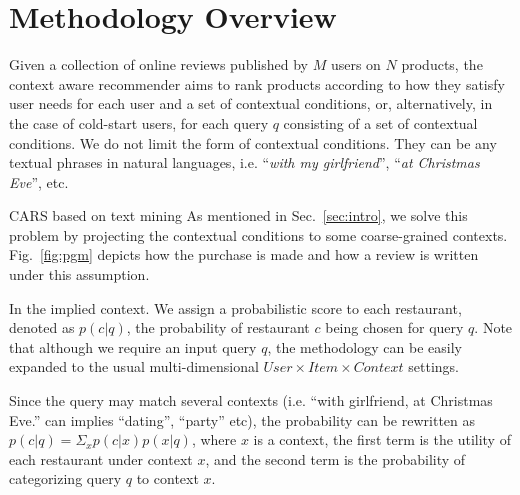 \documentclass[preprint,12pt]{elsarticle}
\begin{document}
\section{Methodology Overview}\label{sec:method}

Given a collection of online reviews published by $M$ users on $N$ products,  the context aware recommender aims to rank products according to how they satisfy user needs for each user and a set of contextual conditions, or, alternatively, in the case of cold-start users, for each query $q$ consisting of a set of contextual conditions. We do not limit the form of contextual conditions. They can be any textual phrases in natural languages, i.e. ``\textit{with my girlfriend}'', ``\textit{at Christmas Eve}'', etc. 

CARS based on text mining As mentioned in Sec.~\ref{sec:intro}, we solve this problem by projecting the contextual conditions to some coarse-grained contexts. Fig.~\ref{fig:pgm} depicts how the purchase is made and how a review is written under this assumption.  



In the implied context. We assign a probabilistic score to each restaurant, denoted as $p(c|q)$, the probability of restaurant $c$ being chosen for query $q$. Note that although we require an input query $q$, the methodology can be easily expanded to the usual multi-dimensional $User\times Item \times Context$ settings.

Since the query may match several contexts (i.e. ``with girlfriend, at Christmas Eve.'' can implies ``dating'', ``party'' etc), the probability can be rewritten as  $p(c|q)=\Sigma_x p(c|x)p(x|q)$, where $x$ is a context, the first term is the utility of each restaurant under context $x$, and the second term is the probability of categorizing query $q$ to context $x$.
\end{document}
